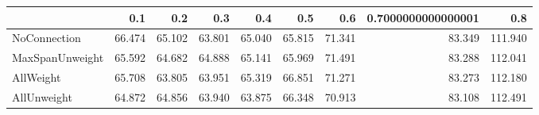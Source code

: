 \begin{tabular}{lrrrrrrrr}
\toprule
{} &    0.1 &    0.2 &    0.3 &    0.4 &    0.5 &    0.6 & 0.7000000000000001 &     0.8 \\
\midrule
NoConnection    & 66.474 & 65.102 & 63.801 & 65.040 & 65.815 & 71.341 &             83.349 & 111.940 \\
MaxSpanUnweight & 65.592 & 64.682 & 64.888 & 65.141 & 65.969 & 71.491 &             83.288 & 112.041 \\
AllWeight       & 65.708 & 63.805 & 63.951 & 65.319 & 66.851 & 71.271 &             83.273 & 112.180 \\
AllUnweight     & 64.872 & 64.856 & 63.940 & 63.875 & 66.348 & 70.913 &             83.108 & 112.491 \\
\bottomrule
\end{tabular}
